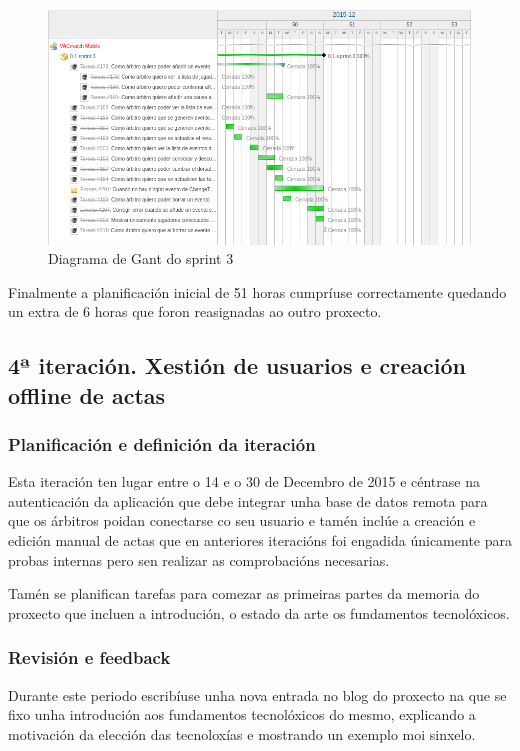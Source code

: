         \begin{figure}[h!]
          \begin{center}
          \includegraphics[width=\textwidth]{./img/gant_diagrams/03.png}
          \caption{Diagrama de Gant do sprint 3}
          \label{fig:gant03}
          \end{center}
        \end{figure}

        Finalmente a planificación inicial de 51 horas cumpríuse correctamente 
quedando un extra de 6 horas que foron reasignadas ao outro proxecto.

    \subsection{4ª iteración. Xestión de usuarios e creación offline de actas}

      \subsubsection{Planificación e definición da iteración}
      Esta iteración ten lugar entre o 14 e o 30 de Decembro de 2015 e céntrase 
na autenticación da aplicación que debe integrar unha base de datos remota para 
que os árbitros poidan conectarse co seu usuario e tamén inclúe a creación e 
edición manual de actas que en anteriores iteracións foi engadida únicamente 
para probas internas pero sen realizar as comprobacións necesarias.

      Tamén se planifican tarefas para comezar as primeiras partes da memoria 
do proxecto que incluen a introdución, o estado da arte os fundamentos 
tecnolóxicos.

      \subsubsection{Revisión e feedback}
      Durante este periodo escribíuse unha nova entrada no blog do proxecto 
na que se fixo unha introdución aos fundamentos tecnolóxicos do mesmo, 
explicando a motivación da elección das tecnoloxías e mostrando un exemplo 
moi sinxelo.

